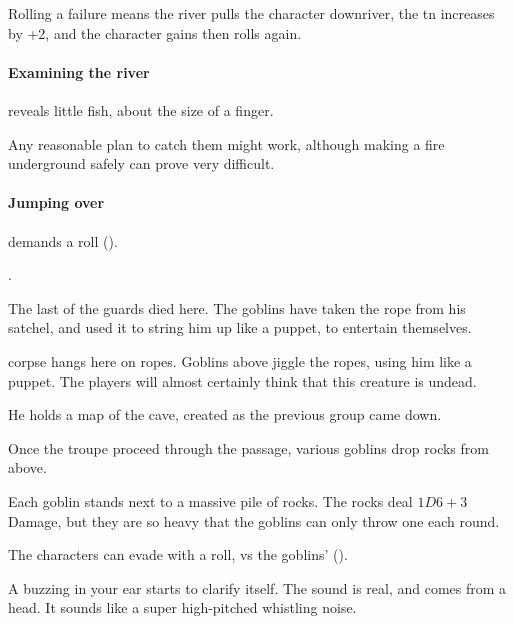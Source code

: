 \begin{multicols}{2}
Rolling a failure means the river pulls the character downriver, the \gls{tn} increases by +2, and the character gains  then rolls again.

\paragraph{Examining the river}
reveals little fish, about the size of a finger.

Any reasonable plan to catch them might work, although making a fire underground safely can prove very difficult.%

\paragraph{Jumping over}
demands a  roll (\tn[12]).

.


\begin{exampletext}
  The last of the \glspl{guard} died here.
  The goblins have taken the rope from his satchel, and used it to string him up like a puppet, to entertain themselves.
\end{exampletext}

 corpse hangs here on ropes.
Goblins above jiggle the ropes, using him like a puppet.
The players will almost certainly think that this creature is undead.

He holds a map of the cave, created as the previous group came down.

Once the troupe proceed through the passage, various goblins drop rocks from above.


Each goblin stands next to a massive pile of rocks.
The rocks deal $1D6+3$ Damage, but they are so heavy that the goblins can only throw one each round.

The characters can evade with a  roll, vs the goblins'  (\tn).

\begin{boxtext}
  A buzzing in your ear starts to clarify itself.
  The sound is real, and comes from a head.
  It sounds like a super high-pitched whistling noise.
\end{boxtext}


\end{multicols}
